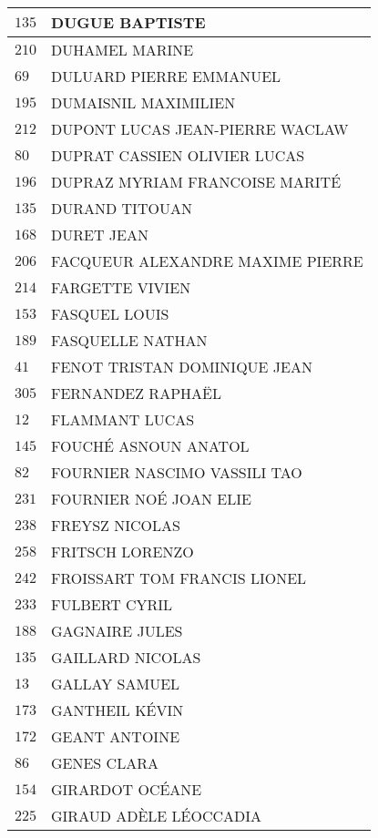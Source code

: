 \begin{xltabular}{\linewidth}{|l|X|}
    \hline
    $135$ & DUGUE BAPTISTE \\
    \hline
    $210$ & DUHAMEL MARINE \\
    \hline
    $69$ & DULUARD PIERRE EMMANUEL \\
    \hline
    $195$ & DUMAISNIL MAXIMILIEN \\
    \hline
    $212$ & DUPONT LUCAS JEAN-PIERRE WACLAW \\
    \hline
    $80$ & DUPRAT CASSIEN OLIVIER LUCAS \\
    \hline
    $196$ & DUPRAZ MYRIAM FRANCOISE MARITÉ \\
    \hline
    $135$ & DURAND TITOUAN \\
    \hline
    $168$ & DURET JEAN \\
    \hline
    $206$ & FACQUEUR ALEXANDRE MAXIME PIERRE \\
    \hline
    $214$ & FARGETTE VIVIEN \\
    \hline
    $153$ & FASQUEL LOUIS \\
    \hline
    $189$ & FASQUELLE NATHAN \\
    \hline
    $41$ & FENOT TRISTAN DOMINIQUE JEAN \\
    \hline
    $305$ & FERNANDEZ RAPHAËL \\
    \hline
    $12$ & FLAMMANT LUCAS \\
    \hline
    $145$ & FOUCHÉ ASNOUN ANATOL \\
    \hline
    $82$ & FOURNIER NASCIMO VASSILI TAO \\
    \hline
    $231$ & FOURNIER NOÉ JOAN ELIE \\
    \hline
    $238$ & FREYSZ NICOLAS \\
    \hline
    $258$ & FRITSCH LORENZO \\
    \hline
    $242$ & FROISSART TOM FRANCIS LIONEL \\
    \hline
    $233$ & FULBERT CYRIL \\
    \hline
    $188$ & GAGNAIRE JULES \\
    \hline
    $135$ & GAILLARD NICOLAS \\
    \hline
    $13$ & GALLAY SAMUEL \\
    \hline
    $173$ & GANTHEIL KÉVIN \\
    \hline
    $172$ & GEANT ANTOINE \\
    \hline
    $86$ & GENES CLARA \\
    \hline
    $154$ & GIRARDOT OCÉANE \\
    \hline
    $225$ & GIRAUD ADÈLE LÉOCCADIA \\

\end{xltabular}
